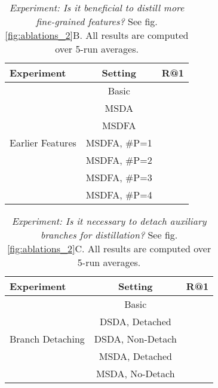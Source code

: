 \documentclass{article} \usepackage{arxiv_style,times}
\begin{document}
\begin{table}[h]
 \small
   \centering
    \caption{\textit{Experiment: Is it beneficial to distill more fine-grained features?} See fig. \ref{fig:ablations_2}B. All results are computed over 5-run averages.}
    \label{tab:ablations_8}   
   \begin{tabular}{l||c|c}
     \toprule
     Experiment & Setting & R@1\\
     \midrule
\multirow{7}{*}{Earlier Features} & Basic & \\
 & MSDA & \\
 & MSDFA & \\
 & MSDFA, \#P=1 & \\
 & MSDFA, \#P=2 & \\
 & MSDFA, \#P=3 & \\
 & MSDFA, \#P=4 & \\
    \bottomrule
    \end{tabular}
 \end{table}
 
 
\begin{table}[h]
 \small
   \centering
    \caption{\textit{Experiment: Is it necessary to detach auxiliary branches for distillation?} See fig. \ref{fig:ablations_2}C. All results are computed over 5-run averages.}   
   \begin{tabular}{l||c|c}
     \toprule
     Experiment & Setting & R@1\\
     \midrule
\multirow{5}{*}{Branch Detaching} & Basic & \\
 & DSDA, Detached & \\
 & DSDA, Non-Detach & \\
 & MSDA, Detached & \\
 & MSDA, No-Detach & \\
    \bottomrule
    \end{tabular}
    \label{tab:ablations_9}
 \end{table}

  

   
  
\end{document}
